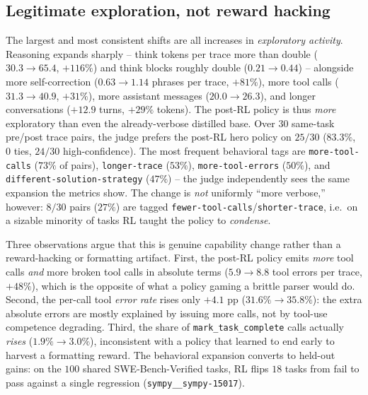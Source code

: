 \documentclass{llmxive}
\begin{document}
\subsection{Legitimate exploration, not reward hacking}
\label{app:rl-behavior-hero}



The largest and most consistent shifts are all increases in \emph{exploratory activity}. Reasoning expands sharply -- think tokens per trace more than double ($30.3\!\to\!65.4$, $+116\%$) and think blocks roughly double ($0.21\!\to\!0.44$) -- alongside more self-correction ($0.63\!\to\!1.14$ phrases per trace, $+81\%$), more tool calls ($31.3\!\to\!40.9$, $+31\%$), more assistant messages ($20.0\!\to\!26.3$), and longer conversations ($+12.9$ turns, $+29\%$ tokens). The post-RL policy is thus \emph{more} exploratory than even the already-verbose distilled base. Over $30$ same-task pre/post trace pairs, the judge prefers the post-RL hero policy on $25/30$ ($83.3\%$, $0$ ties, $24/30$ high-confidence). The most frequent behavioral tags are \texttt{more-tool-calls} ($73\%$ of pairs), \texttt{longer-trace} ($53\%$), \texttt{more-tool-errors} ($50\%$), and \texttt{different-solution-strategy} ($47\%$) -- the judge independently sees the same expansion the metrics show. The change is \emph{not} uniformly ``more verbose,'' however: $8/30$ pairs ($27\%$) are tagged \texttt{fewer-tool-calls}/\texttt{shorter-trace}, i.e.\ on a sizable minority of tasks RL taught the policy to \emph{condense}.

Three observations argue that this is genuine capability change rather than a reward-hacking or formatting artifact. First, the post-RL policy emits \emph{more} tool calls \emph{and} more broken tool calls in absolute terms ($5.9\!\to\!8.8$ tool errors per trace, $+48\%$), which is the opposite of what a policy gaming a brittle parser would do. Second, the per-call tool \emph{error rate} rises only $+4.1$ pp ($31.6\%\!\to\!35.8\%$): the extra absolute errors are mostly explained by issuing more calls, not by tool-use competence degrading. Third, the share of \texttt{mark\_task\_complete} calls actually \emph{rises} ($1.9\%\!\to\!3.0\%$), inconsistent with a policy that learned to end early to harvest a formatting reward. The behavioral expansion converts to held-out gains: on the $100$ shared SWE-Bench-Verified tasks, RL flips $18$ tasks from fail to pass against a single regression (\texttt{sympy\_\_sympy-15017}).
\end{document}
